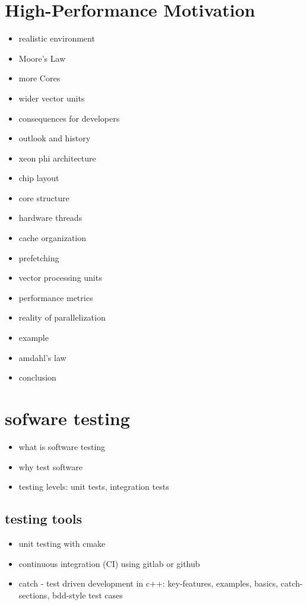 \documentclass[8pt,a4paper,fleqn]{article}
\begin{document}
\begin{multicols}{2}
  \section{High-Performance Motivation} %
  \label{sec:high_performance_motivation}
  \begin{itemize}
    \item realistic environment
    \item Moore's Law
    \item more Cores
    \item wider vector units
    \item consequences for developers
    \item outlook and history
    \item xeon phi architecture
    \item chip layout
    \item core structure
    \item hardware threads
    \item cache organization
    \item prefetching
    \item vector processing units
    \item performance metrics
    \item reality of parallelization
    \item example
    \item amdahl's law
    \item conclusion
  \end{itemize}

  \section{sofware testing} %
  \label{sec:sofware_testing}
  \begin{itemize}
    \item what is software testing
    \item why test software
    \item testing levels: unit tests, integration tests
  \end{itemize}
  \subsection{testing tools} %
  \label{sub:testing_tools}
  \begin{itemize}
    \item unit testing with cmake
    \item continuous integration (CI) using gitlab or github
    \item catch - test driven development in c++: key-features, examples, basics, catch-sections, bdd-style test cases
  \end{itemize}

\end{multicols}
\end{document}
